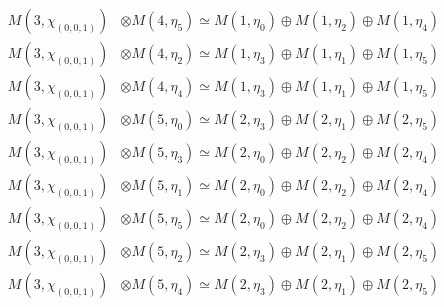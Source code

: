 \begin{align*}
M(3,\chi_{(0,0,1)}) &\otimes M(4,\eta_{5}) \simeq M(1,\eta_{0}) \oplus M(1,\eta_{2}) \oplus M(1,\eta_{4})\\
M(3,\chi_{(0,0,1)}) &\otimes M(4,\eta_{2}) \simeq M(1,\eta_{3}) \oplus M(1,\eta_{1}) \oplus M(1,\eta_{5})\\
M(3,\chi_{(0,0,1)}) &\otimes M(4,\eta_{4}) \simeq M(1,\eta_{3}) \oplus M(1,\eta_{1}) \oplus M(1,\eta_{5})\\
M(3,\chi_{(0,0,1)}) &\otimes M(5,\eta_{0}) \simeq M(2,\eta_{3}) \oplus M(2,\eta_{1}) \oplus M(2,\eta_{5})\\
M(3,\chi_{(0,0,1)}) &\otimes M(5,\eta_{3}) \simeq M(2,\eta_{0}) \oplus M(2,\eta_{2}) \oplus M(2,\eta_{4})\\
M(3,\chi_{(0,0,1)}) &\otimes M(5,\eta_{1}) \simeq M(2,\eta_{0}) \oplus M(2,\eta_{2}) \oplus M(2,\eta_{4})\\
M(3,\chi_{(0,0,1)}) &\otimes M(5,\eta_{5}) \simeq M(2,\eta_{0}) \oplus M(2,\eta_{2}) \oplus M(2,\eta_{4})\\
M(3,\chi_{(0,0,1)}) &\otimes M(5,\eta_{2}) \simeq M(2,\eta_{3}) \oplus M(2,\eta_{1}) \oplus M(2,\eta_{5})\\
M(3,\chi_{(0,0,1)}) &\otimes M(5,\eta_{4}) \simeq M(2,\eta_{3}) \oplus M(2,\eta_{1}) \oplus M(2,\eta_{5})\\
\end{align*}

